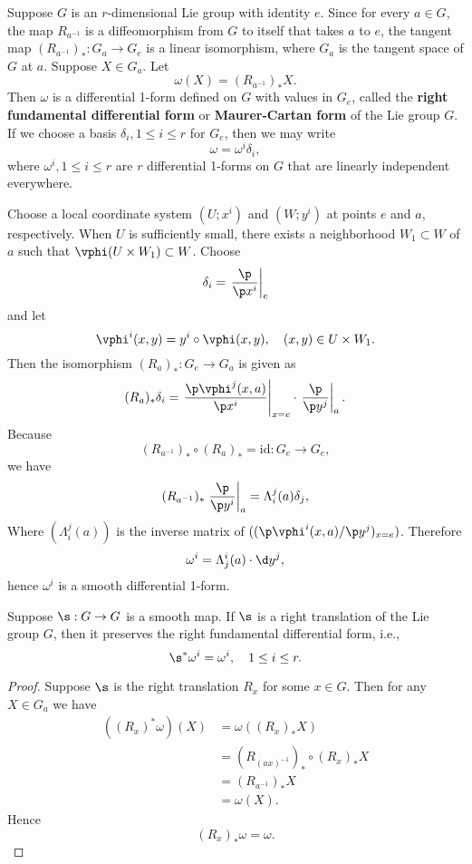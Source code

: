 \documentclass[11pt]{article}
\begin{document}
Suppose $G$ is an $r$-dimensional Lie group with identity $e$. Since for every $a \in G$, the map $R_{a^{-1}}$ is a diffeomorphism from $G$ to itself that takes $a$ to $e$, the tangent map $(R_{a^{-1}})_* : G_a \rightarrow G_e$ is a linear isomorphism, where $G_a$ is the tangent space of $G$ at $a$. Suppose $X \in G_a$. Let $$\omega(X) = (R_{a^{-1}})_*X.$$ Then $\omega$ is a differential 1-form defined on $G$ with values in $G_e$, called the \textbf{right fundamental differential form} or \textbf{Maurer-Cartan form} of the Lie group $G$. If we choose a basis $\delta_i, 1 \le i\le r$ for $G_e$, then we may write $$\omega = \omega^i\delta_i,$$ where $\omega^i, 1 \le i \le r$ are $r$ differential 1-forms on $G$ that are linearly independent everywhere.

Choose a local coordinate system $(U; x^i)$ and $(W; y^i)$ at points $e$ and $a$, respectively. When $U$ is sufficiently small, there exists a neighborhood $W_1 \subset W$ of $a$ such that $\vphi(U \times W_1) \subset W$. Choose $$\delta_i = \left.\frac{\p}{\p x^i}\right|_e$$ and let $$\vphi^i(x, y) = y^i \circ \vphi(x, y), \quad (x, y) \in U \times W_1.$$ Then the isomorphism $(R_a)_* : G_e \rightarrow G_a$ is given as $$(R_a)_*\delta_i = \left.\frac{\p\vphi^j(x, a)}{\p x^i}\right|_{x=e} \cdot \left.\frac{\p}{\p y^j}\right|_{a}.$$ Because $$(R_{a^{-1}})_* \circ (R_a)_* = \text{id} : G_e \rightarrow G_e,$$ we have $$(R_{a^{-1}})_*\left.\frac{\p}{\p y^i}\right|_a = \Lambda^j_i(a) \delta_j,$$ Where $(\Lambda^j_i(a))$ is the inverse matrix of $((\p \vphi^i(x, a)/\p y^j)_{x=e})$. Therefore $$\omega^i = \Lambda^i_j(a) \cdot \d y^j,$$ hence $\omega^i$ is a smooth differential 1-form. 

\begin{theorem}
    Suppose $\s : G \rightarrow G$ is a smooth map. If $\s$ is a right translation of the Lie group $G$, then it preserves the right fundamental differential form, i.e., $$\s^*\omega^i = \omega^i, \quad 1 \le i \le r.$$
\end{theorem}
\begin{proof}
    Suppose $\s$ is the right translation $R_x$ for some $x \in G$. Then for any $X \in G_a$ we have 
    \begin{align*}
        ((R_x)^*\omega)(X) &= \omega((R_x)_*X) \\
        &= (R_{(ax)^{-1}})_* \circ (R_x)_*X \\
        &= (R_{a^{-1}})_*X \\ 
        &= \omega(X).
    \end{align*}
    Hence $$(R_x)_*\omega = \omega.$$
\end{proof}
\end{document}
